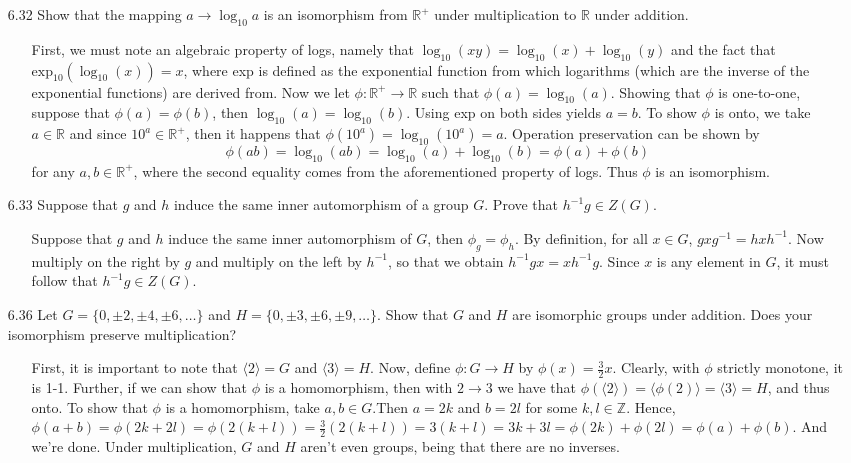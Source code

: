 \documentclass[12pt]{article}
\begin{document}
\begin{enumerate}
\item[6.32] Show that the mapping $a \rightarrow \log_{10} a$ is an isomorphism from 
$\mathbb{R}^+$ under multiplication to $\mathbb{R}$ under addition.
\begin{enumerate}
\item[] First, we must note an algebraic property of logs, namely that $\log_{10}(xy) = \log_{10}(x) + \log_{10}(y)$ and
the fact that $\mbox{exp}_{10}(\log_{10}(x)) = x$, where exp is defined as the exponential function from 
which logarithms (which are the inverse of the exponential functions) are derived from. Now
we let $\phi : \mathbb{R}^+ \rightarrow \mathbb{R}$ such that $\phi(a) = \log_{10}(a)$.
Showing that $\phi$ is one-to-one, suppose that $\phi (a) = \phi (b)$, then $\log_{10}(a) = \log_{10}(b)$.
Using exp on both sides yields $a = b$. To show $\phi$ is onto, we take $a \in \mathbb{R}$ and since
$10^a \in \mathbb{R}^+$, then it happens that $\phi (10^a) = \log_{10}(10^a) = a$. Operation preservation
can be shown by  \[ \phi (ab) = \log_{10}(ab) = \log_{10}(a) + \log_{10}(b) = \phi (a) + \phi (b) \] 
for any $a, b \in \mathbb{R}^+$, where the second equality comes from the aforementioned property of logs.
Thus $\phi$ is an isomorphism.
\end{enumerate}

\item[6.33] Suppose that $g$ and $h$ induce the same inner automorphism of a group $G$.
Prove that $h^{-1}g \in Z(G)$.
\begin{enumerate}
\item[] Suppose that $g$ and $h$ induce the same inner automorphism of $G$, then $\phi_g = \phi_h$.
By definition, for all $x \in G$, $gxg^{-1} = hxh^{-1}$. Now multiply on the right by $g$ and
multiply on the left by $h^{-1}$, so that we obtain $h^{-1}gx = xh^{-1}g$. Since $x$ is any
element in $G$, it must follow that $h^{-1}g \in Z(G)$.
\end{enumerate}

\item[6.36] Let $G = \{ 0, \pm 2, \pm 4, \pm 6, \ldots \}$ and $H = \{ 0, \pm 3, \pm 6, \pm 9, \ldots \}$. Show that $G$ and $H$ are isomorphic groups under addition. Does your isomorphism preserve multiplication?
\begin{enumerate}
\item[] First, it is important to note that $\langle 2\rangle = G$ and $\langle 3\rangle = H$. Now, define $\phi : G \to H$
by $\phi(x) = \frac{3}{2}x$. Clearly, with $\phi$ strictly monotone, it is 1-1. Further, if
we can show that $\phi$ is a homomorphism, then with $2 \to 3$ we have that $\phi(\langle 2\rangle) = \langle \phi(2) \rangle = \langle 3\rangle = H$, and thus onto. To show that $\phi$ is a homomorphism, take $a,b \in G$.Then $a = 2k$ and $b = 2l$ for some $k,l \in \mathbb{Z}$. 
Hence, $\phi(a+b) = \phi(2k+2l) = \phi(2(k+l)) = \frac{3}{2}(2(k+l)) = 3(k+l) = 3k + 3l = \phi(2k)+\phi(2l)=\phi(a)+\phi(b)$. And we're done. Under multiplication, $G$ and $H$ aren't even groups, being that there are no inverses.
\end{enumerate}


\end{enumerate}
\end{document}
